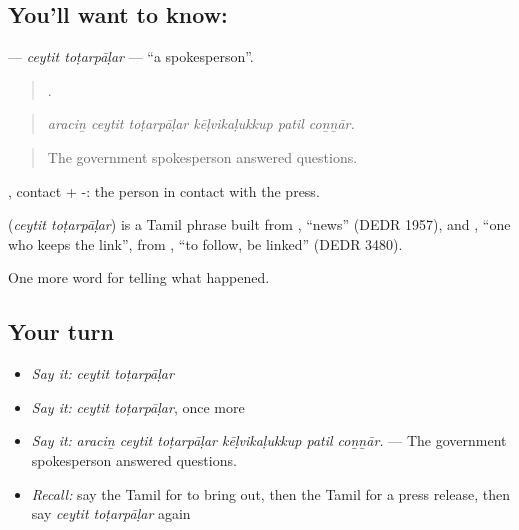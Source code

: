 \subsection*{You'll want to know:  }
\textbf{ } — \emph{ceytit toṭarpāḷar} — \textquotedblleft{}a spokesperson\textquotedblright{}.

\begin{quote}
     .
\end{quote}

\begin{quote}
\emph{araciṉ ceytit toṭarpāḷar kēḷvikaḷukkup patil coṉṉār.}
\end{quote}

\begin{quote}
The government spokesperson answered questions.
\end{quote}

, contact + -: the person in contact with the press.

\begin{cousinweb}
\textbf{ } (\emph{ceytit toṭarpāḷar}) is a Tamil phrase built from , \textquotedblleft{}news\textquotedblright{} (DEDR 1957), and , \textquotedblleft{}one who keeps the link\textquotedblright{}, from , \textquotedblleft{}to follow, be linked\textquotedblright{} (DEDR 3480).
\end{cousinweb}

\begin{grammarlens}[title={What you've built}]
One more word for telling what happened.
\end{grammarlens}

\subsection*{Your turn}
\begin{itemize}
\raggedright
  \item \emph{Say it:} \emph{ceytit toṭarpāḷar}
  \item \emph{Say it:} \emph{ceytit toṭarpāḷar}, once more
  \item \emph{Say it:} \emph{araciṉ ceytit toṭarpāḷar kēḷvikaḷukkup patil coṉṉār.} — The government spokesperson answered questions.
  \item \emph{Recall:} say the Tamil for to bring out, then the Tamil for a press release, then say \emph{ceytit toṭarpāḷar} again
\end{itemize}

